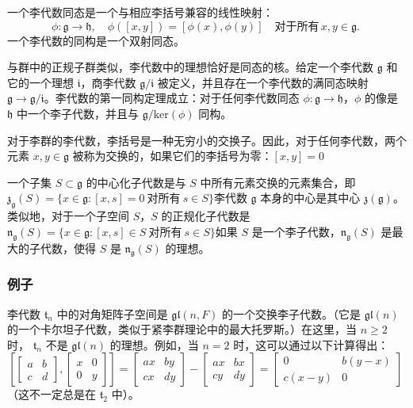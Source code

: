 一个李代数同态是一个与相应李括号兼容的线性映射：  
\[
\phi \colon \mathfrak{g} \to \mathfrak{h}, \quad \phi([x,y]) = [\phi(x), \phi(y)] \quad \text{对于所有} \, x, y \in \mathfrak{g}.~
\]  
一个李代数的同构是一个双射同态。

与群中的正规子群类似，李代数中的理想恰好是同态的核。给定一个李代数 \( \mathfrak{g} \) 和它的一个理想 \( \mathfrak{i} \)，商李代数 \( \mathfrak{g}/\mathfrak{i} \) 被定义，并且存在一个李代数的满同态映射 \( \mathfrak{g} \to \mathfrak{g}/\mathfrak{i} \)。李代数的第一同构定理成立：对于任何李代数同态 \( \phi \colon \mathfrak{g} \to \mathfrak{h} \)，\( \phi \) 的像是 \( \mathfrak{h} \) 中一个李子代数，并且与 \( \mathfrak{g}/\text{ker}(\phi) \) 同构。

对于李群的李代数，李括号是一种无穷小的交换子。因此，对于任何李代数，两个元素 \( x, y \in \mathfrak{g} \) 被称为交换的，如果它们的李括号为零：\([x,y] = 0\)

一个子集 \( S \subset \mathfrak{g} \) 的中心化子代数是与 \( S \) 中所有元素交换的元素集合，即\(\mathfrak{z}_{\mathfrak{g}}(S) = \{ x \in \mathfrak{g} : [x,s] = 0 \ \text{对所有} \ s \in S \}\)李代数 \( \mathfrak{g} \) 本身的中心是其中心 \( \mathfrak{z}(\mathfrak{g}) \)。类似地，对于一个子空间 \( S \)，\( S \) 的正规化子代数是\(\mathfrak{n}_{\mathfrak{g}}(S) = \{ x \in \mathfrak{g} : [x,s] \in S \ \text{对所有} \ s \in S \}\)如果 \( S \) 是一个李子代数，\( \mathfrak{n}_{\mathfrak{g}}(S) \) 是最大的子代数，使得 \( S \) 是 \( \mathfrak{n}_{\mathfrak{g}}(S) \) 的理想。
\subsubsection{例子}  
李代数 \( \mathfrak{t}_n \) 中的对角矩阵子空间是 \( \mathfrak{gl}(n,F) \) 的一个交换李子代数。（它是 \( \mathfrak{gl}(n) \) 的一个卡尔坦子代数，类似于紧李群理论中的最大托罗斯。）在这里，当 \( n \geq 2 \) 时， \( \mathfrak{t}_n \) 不是 \( \mathfrak{gl}(n) \) 的理想。例如，当 \( n = 2 \) 时，这可以通过以下计算得出：
\[
\left[ \begin{bmatrix} a & b \\ c & d \end{bmatrix}, \begin{bmatrix} x & 0 \\ 0 & y \end{bmatrix} \right] = \begin{bmatrix} ax & by \\ cx & dy \end{bmatrix} - \begin{bmatrix} ax & bx \\ cy & dy \end{bmatrix} = \begin{bmatrix} 0 & b(y - x) \\ c(x - y) & 0 \end{bmatrix}~
\]
（这不一定总是在 \( \mathfrak{t}_2 \) 中）。  

